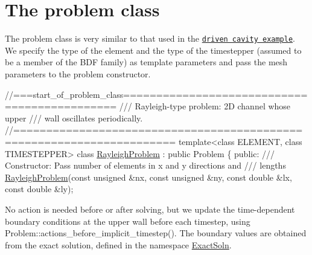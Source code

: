  

\hypertarget{index_problem}{}\section{The problem class}\label{index_problem}
The problem class is very similar to that used in the \href{../../driven_cavity/html/index.html}{\tt driven cavity example}. We specify the type of the element and the type of the timestepper (assumed to be a member of the B\+DF family) as template parameters and pass the mesh parameters to the problem constructor.

 
\begin{DoxyCodeInclude}
\textcolor{comment}{//===start\_of\_problem\_class=============================================}
\textcolor{comment}{/// Rayleigh-type problem: 2D channel whose upper}
\textcolor{comment}{}\textcolor{comment}{/// wall oscillates periodically.}
\textcolor{comment}{}\textcolor{comment}{//======================================================================}
\textcolor{keyword}{template}<\textcolor{keyword}{class} ELEMENT, \textcolor{keyword}{class} TIMESTEPPER>
\textcolor{keyword}{class }\hyperlink{classRayleighProblem}{RayleighProblem} : \textcolor{keyword}{public} Problem
\{
\textcolor{keyword}{public}:
\textcolor{comment}{}
\textcolor{comment}{ /// Constructor: Pass number of elements in x and y directions and }
\textcolor{comment}{ /// lengths}
\textcolor{comment}{} \hyperlink{classRayleighProblem_a53aeda7918553889b3fa0dd70cdb30f1}{RayleighProblem}(\textcolor{keyword}{const} \textcolor{keywordtype}{unsigned} &nx, \textcolor{keyword}{const} \textcolor{keywordtype}{unsigned} &ny, 
                 \textcolor{keyword}{const} \textcolor{keywordtype}{double} &lx, \textcolor{keyword}{const} \textcolor{keywordtype}{double} &ly);

\end{DoxyCodeInclude}


No action is needed before or after solving, but we update the time-\/dependent boundary conditions at the upper wall before each timestep, using {\ttfamily Problem\+::actions\+\_\+before\+\_\+implicit\+\_\+timestep()}. The boundary values are obtained from the exact solution, defined in the namespace {\ttfamily \hyperlink{namespaceExactSoln}{Exact\+Soln}}.


